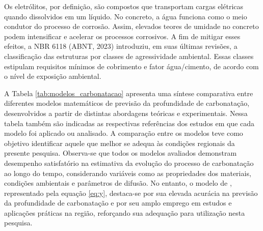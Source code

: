 Os eletrólitos, por definição, são compostos que transportam cargas elétricas quando dissolvidos em um líquido. No concreto, a água funciona como o meio condutor do processo de corrosão. Assim, elevados teores de umidade no concreto podem intensificar e acelerar os processos corrosivos. A fim de mitigar esses efeitos, a NBR 6118 (ABNT, 2023) introduziu, em suas últimas revisões, a classificação das estruturas por classes de agressividade ambiental. Essas classes estipulam requisitos mínimos de cobrimento e fator água/cimento, de acordo com o nível de exposição ambiental. 

A Tabela \ref{tab:modelos_carbonatacao} apresenta uma síntese comparativa entre diferentes modelos matemáticos de previsão da profundidade de carbonatação, desenvolvidos a partir de distintas abordagens teóricas e experimentais. Nessa tabela também são indicadas as respectivas referências dos estudos em que cada modelo foi aplicado ou analisado. A comparação entre os modelos teve como objetivo identificar aquele que melhor se adequa às condições regionais da presente pesquisa. Observa-se que todos os modelos avaliados demonstram desempenho satisfatório na estimativa da evolução do processo de carbonatação ao longo do tempo, considerando variáveis como as propriedades dos materiais, condições ambientais e parâmetros de difusão. No entanto, o modelo de \textcite{possan2010}, representado pela equação \eqref{eq:y}, destaca-se por sua elevada acurácia na previsão da profundidade de carbonatação e por seu amplo emprego em estudos e aplicações práticas na região, reforçando sua adequação para utilização nesta pesquisa.

